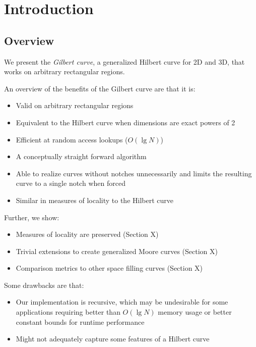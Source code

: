 \section{Introduction}

\subsection{Overview}

We present the \textit{Gilbert curve}, a generalized Hilbert curve for 2D and 3D,
that works on arbitrary rectangular regions.

An overview of the benefits of the Gilbert curve are that it is:

\begin{itemize}
  \item Valid on arbitrary rectangular regions
  \item Equivalent to the Hilbert curve when dimensions are exact powers of 2
  \item Efficient at random access lookups ($O(\lg N)$)
  \item A conceptually straight forward algorithm
  \item Able to realize curves without notches unnecessarily and limits the resulting curve
        to a single notch when forced
  \item Similar in measures of locality to the Hilbert curve
\end{itemize}

Further, we show:

\begin{itemize}
  \item Measures of locality are preserved (Section X)
  \item Trivial extensions to create generalized Moore curves (Section X)
  \item Comparison metrics to other space filling curves (Section X)
\end{itemize}

Some drawbacks are that:

\begin{itemize}
  \item Our implementation is recursive,
        which may be undesirable for some applications requiring better than $O( \lg N)$
        memory usage or better constant bounds for runtime performance
  \item Might not adequately capture some features of a Hilbert curve
\end{itemize}


